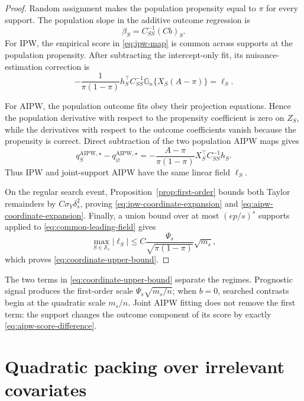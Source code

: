\documentclass[a4paper,10pt,english]{article}
\begin{document}
\begin{proof}
Random assignment makes the population propensity equal to $\pi$ for
every support.  The population slope in the additive outcome regression is
\begin{equation*}
 \beta_S=C_{SS}^{-1}(Cb)_S.
\end{equation*}
For IPW, the empirical score in \eqref{eq:ipw-map} is common across
supports at the population propensity.  After subtracting the
intercept-only fit, its nuisance-estimation correction is
\begin{equation*}
 -\frac{1}{\pi(1-\pi)}h_S^\top C_{SS}^{-1}
 \mathbb G_n\{X_S(A-\pi)\}=\ell_S.
\end{equation*}

For AIPW, the population outcome fits obey their projection equations.
Hence the population derivative with respect to the propensity coefficient
is zero on $Z_S$, while the derivatives with respect to the outcome
coefficients vanish because the propensity is correct.  Direct subtraction
of the two population AIPW maps gives
\begin{equation}\label{eq:aipw-score-difference}
 q_S^{\mathrm{AIPW},\star}-q_\varnothing^{\mathrm{AIPW},\star}
 =-\frac{A-\pi}{\pi(1-\pi)}
 X_S^\top C_{SS}^{-1}h_S.
\end{equation}
Thus IPW and joint-support AIPW have the same linear field $\ell_S$.

On the regular search event, Proposition~\ref{prop:first-order} bounds both
Taylor remainders by $C\sigma_Y\delta_s^2$, proving
\eqref{eq:ipw-coordinate-expansion} and
\eqref{eq:aipw-coordinate-expansion}.  Finally, a union bound over at most
$(ep/s)^s$ supports applied to \eqref{eq:common-leading-field} gives
\begin{equation*}
 \max_{S\in\mathcal S_s}|\ell_S|
 \le C\frac{\Psi_s}{\sqrt{\pi(1-\pi)}}\sqrt{m_s},
\end{equation*}
which proves \eqref{eq:coordinate-upper-bound}.
\end{proof}

The two terms in \eqref{eq:coordinate-upper-bound} separate the regimes.
Prognostic signal produces the first-order scale
$\Psi_s\sqrt{m_s/n}$; when $b=0$, searched contrasts begin at the
quadratic scale $m_s/n$.  Joint AIPW fitting does not remove the first term:
the support changes the outcome component of its score by exactly
\eqref{eq:aipw-score-difference}.

\section{Quadratic packing over irrelevant covariates}
\end{document}
